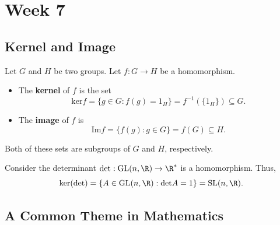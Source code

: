 \section{Week 7}

\subsection{Kernel and Image}

\begin{definition}
    Let \( G  \) and \( H  \) be two groups. Let \( f : G \to H  \) be a homomorphism. 

    \begin{itemize}
        \item  The \textbf{kernel} of \( f  \) is the set 
            \[  \text{ker}f = \{ g \in G : f(g) = {1}_{H} \}  = f^{-1}(\{ {1}_{H} \} ) \subseteq  G. \]
        \item The \textbf{image} of \( f  \) is 
            \[  \text{Im}f = \{ f(g) : g \in G  \} = f(G) \subseteq  H.  \]
    \end{itemize}
\end{definition}

Both of these sets are subgroups of \(  G  \) and \( H  \), respectively.

\begin{eg}
    Consider the determinant \( \text{det} : \text{GL}(n, \R ) \to \R^{*}  \) is a homomorphism. Thus,    
    \[  \text{ker}(\text{det}) = \{  A \in \text{GL}(n, \R ) : \text{det} A = 1  \}  = \text{SL}(n,\R). \]
\end{eg}

\subsection{A Common Theme in Mathematics}

